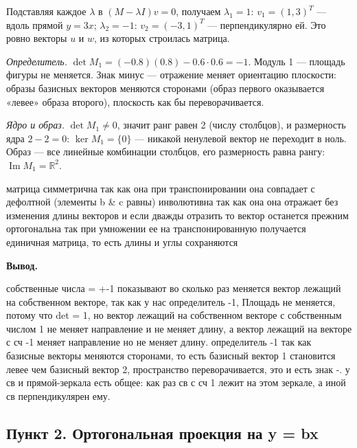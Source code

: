 \documentclass[a4paper,14pt]{extarticle}
\begin{document}
Подставляя каждое \(\lambda\) в \((M - \lambda I)v = 0\), получаем
\(\lambda_1 = 1\): \(v_1 = (1, 3)^T\) --- вдоль прямой \(y = 3x\);
\(\lambda_2 = -1\): \(v_2 = (-3, 1)^T\) --- перпендикулярно ей. Это
ровно векторы \(u\) и \(w\), из которых строилась матрица.

\emph{Определитель.} \(\det M_1 = (-0.8)(0.8) - 0.6 \cdot 0.6 = -1\).
Модуль 1 --- площадь фигуры не меняется. Знак минус --- отражение меняет
ориентацию плоскости: образы базисных векторов меняются сторонами (образ
первого оказывается «левее» образа второго), плоскость как бы
переворачивается.

\emph{Ядро и образ.} \(\det M_1 \ne 0\), значит ранг равен 2 (числу
столбцов), и размерность ядра \(2 - 2 = 0\): \(\ker M_1 = \{0\}\) ---
никакой ненулевой вектор не переходит в ноль. Образ --- все линейные
комбинации столбцов, его размерность равна рангу:
\(\operatorname{Im} M_1 = \mathbb{R}^2\).

матрица симметрична так как она при транспонировании она совпадает с
дефолтной (элементы b \& c равны) инволютивна так как она она отражает
без изменения длины векторов и если дважды отразить то вектор останется
прежним ортогональна так при умножении ее на транспонированную
получается единичная матрица, то есть длины и углы сохраняются

\textbf{Вывод.}

собственные числа = +-1 показывают во сколько раз меняется вектор
лежащий на собственном векторе, так как у нас определитель -1, Площадь
не меняется, потому что \textbar det\textbar{} = 1, но вектор лежащий на
собственном векторе с собственным числом 1 не меняет направление и не
меняет длину, а вектор лежащий на векторе с сч -1 меняет направление но
не меняет длину. определитель -1 так как базисные векторы меняются
сторонами, то есть базисный вектор 1 становится левее чем базисный
вектор 2, пространство переворачивается, это и есть знак -. у св и
прямой-зеркала есть общее: как раз св с сч 1 лежит на этом зеркале, а
иной св перпендикулярен ему.

\hypertarget{ux43fux443ux43dux43aux442-2.-ux43eux440ux442ux43eux433ux43eux43dux430ux43bux44cux43dux430ux44f-ux43fux440ux43eux435ux43aux446ux438ux44f-ux43dux430-y-bx}{%
\subsection{Пункт 2. Ортогональная проекция на y =
bx}\label{ux43fux443ux43dux43aux442-2.-ux43eux440ux442ux43eux433ux43eux43dux430ux43bux44cux43dux430ux44f-ux43fux440ux43eux435ux43aux446ux438ux44f-ux43dux430-y-bx}}
\end{document}
